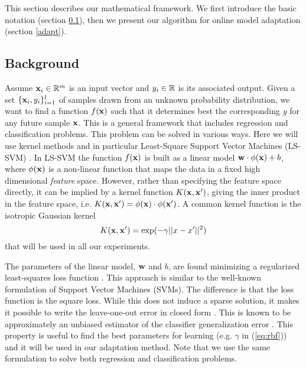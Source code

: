 This section describes our mathematical framework. We first introduce the basic notation (section \ref{back}), then we 
present our algorithm for online model adaptation (section \ref{adapt}).


\subsection{Background}
\label{back}

Assume $\mathbf{x}_i \in \mathbb{R}^m$ is an input vector and $y_i \in \mathbb{R}$ is its associated output.
Given a set $\{\mathbf{x}_i,y_i\}_{i=1}^l$ of samples drawn from an unknown probability
distribution, we want to find a function $f(\mathbf{x})$ such that it determines
best 
the corresponding 
$y$ for any future sample $\mathbf{x}$.
This is a general framework that includes regression and classification problems.
This problem can be solved in various ways. Here we will use kernel methods and in
particular Least-Square Support Vector Machines (LS-SVM) \cite{Cristianini00}.
In LS-SVM the function $f(\mathbf{x})$ is built as a linear model
$\mathbf{w} \cdot \phi(\mathbf{x}) + b$, where $\phi(\mathbf{x})$ is a non-linear function that maps
the data in a fixed high dimensional \emph{feature} space.
However, rather than specifying the feature space directly,
it can be implied by a kernel function $K(\mathbf{x},\mathbf{x}')$, giving the
inner product %
in the feature
space, i.e. $K(\mathbf{x},\mathbf{x}')=\phi(\mathbf{x}) \cdot \phi(\mathbf{x}')$.
A common kernel function is the isotropic Gaussian kernel
\begin{equation}
	K(\mathbf{x},\mathbf{x}')=\exp(-\gamma ||x-x'||^2)
	\label{eq:rbf}
\end{equation}
that will be used in all our experiments.

The parameters of the linear model, $\mathbf{w}$ and $b$, are found minimizing a
regularized least-squares loss function \cite{Cristianini00}.
This approach is similar to the well-known formulation of Support Vector
Machines (SVMs). The difference is that the loss function is the square loss. 
While this
does not induce a sparse solution,
it makes it  possible to write
the leave-one-out error in closed form \cite{Rifkin07}. This is known to be
approximately an unbiased estimator of the classifier generalization error
\cite{LuntzB69}. This property is useful to find the best parameters for
learning (e.g. $\gamma$ in (\ref{eq:rbf})) and it will be used in our
adaptation method. Note that we use the same formulation  to solve both
regression and classification problems.

